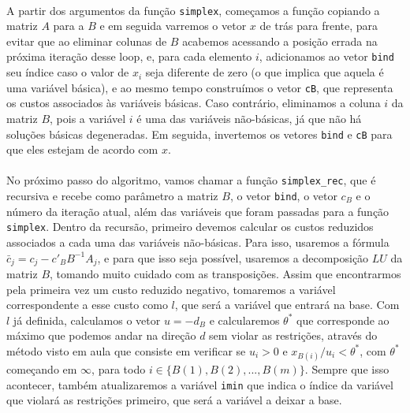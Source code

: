 \documentclass[a4paper]{article}
\begin{document}
\paragraph{}
A partir dos argumentos da função \texttt{simplex}, começamos a função copiando a matriz $A$ para a $B$ e em seguida varremos o vetor $x$ de trás para frente, para evitar que ao eliminar colunas de $B$ acabemos acessando a posição errada na próxima iteração desse loop, e, para cada elemento $i$, adicionamos ao vetor \texttt{bind} seu índice caso o valor de $x_{i}$ seja diferente de zero (o que implica que aquela é uma variável básica), e ao mesmo tempo construímos o vetor \texttt{cB}, que representa os custos associados às variáveis básicas. Caso contrário, eliminamos a coluna $i$ da matriz $B$, pois a variável $i$ é uma das variáveis não-básicas, já que não há soluções básicas degeneradas. Em seguida, invertemos os vetores \texttt{bind} e \texttt{cB} para que eles estejam de acordo com $x$.\paragraph{}
No próximo passo do algoritmo, vamos chamar a função \verb|simplex_rec|, que é recursiva e recebe como parâmetro a matriz $B$, o vetor \texttt{bind}, o vetor $c_{B}$ e o número da iteração atual, além das variáveis que foram passadas para a função \texttt{simplex}. Dentro da recursão, primeiro devemos calcular os custos reduzidos associados a cada uma das variáveis não-básicas. Para isso, usaremos a fórmula \begin{math}\bar{c}_{j} = c_{j} - c'_{B}B^{-1}A_{j}\end{math}, e para que isso seja possível, usaremos a decomposição $LU$ da matriz $B$, tomando muito cuidado com as transposições.
Assim que encontrarmos pela primeira vez um custo reduzido negativo, tomaremos a variável correspondente a esse custo como $l$, que será a variável que entrará na base. Com $l$ já definida, calculamos o vetor $u = -d_{B}$ e calcularemos $\theta^*$ que corresponde ao máximo que podemos andar na direção $d$ sem violar as restrições, através do método visto em aula que consiste em verificar se $u_{i} > 0$ e $x_{B(i)}/u_{i} < \theta^*$, com $\theta^*$ começando em $\infty$, para todo $i \in \{B(1), B(2), ..., B(m)\}$. Sempre que isso acontecer, também atualizaremos a variável \texttt{imin} que indica o índice da variável que violará as restrições primeiro, que será a variável a deixar a base.\paragraph{}
\end{document}
